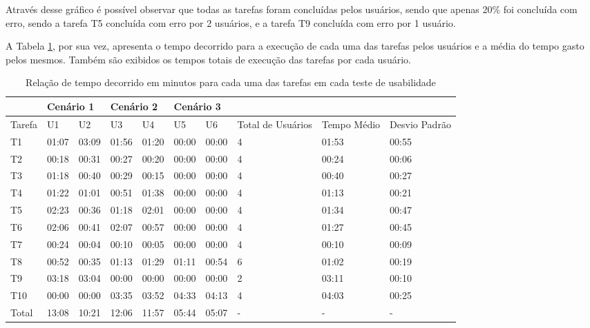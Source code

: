 Através desse gráfico é possível observar que todas as tarefas foram concluídas pelos 
usuários, sendo que apenas 20\% foi concluída com erro, sendo a tarefa T5 concluída com 
erro por 2 usuários, e a tarefa T9 concluída com erro por 1 usuário.

A Tabela \ref{table:tempos-execucao}, por sua vez, apresenta o tempo decorrido para a execução 
de cada uma das tarefas pelos usuários e a média do tempo gasto pelos mesmos. Também são 
exibidos os tempos totais de execução das tarefas por cada usuário.

\begin{table}[!htb]
    \centering
    \caption{ Relação de tempo decorrido em minutos para cada uma das tarefas em cada teste de usabilidade}
    \label{table:tempos-execucao}
    \begin{tabular}{|p{1.2cm}|p{1.2cm}|p{1.2cm}|p{1.2cm}|p{1.2cm}|p{1.2cm}|p{1.2cm}|p{1.2cm}|p{1.5cm}|p{1.2cm}|}
        \hline
        &  \multicolumn{2}{p{2.4cm}|}{Cenário 1} & \multicolumn{2}{p{2.4cm}|}{Cenário 2} & \multicolumn{2}{p{2.4cm}|}{Cenário 3} & & &\\
        \hline
        Tarefa & U1 & U2 & U3 & U4 & U5 & U6 & Total de Usuários & Tempo Médio & Desvio Padrão \\
        \hline
        T1 & 01:07 & 03:09 & 01:56 & 01:20 & 00:00 & 00:00 & 4 & 01:53 & 00:55 \\
        \hline
        T2 & 00:18 & 00:31 & 00:27 & 00:20 & 00:00 & 00:00 & 4 & 00:24 & 00:06\\          
        \hline
        T3 & 01:18 & 00:40 & 00:29 & 00:15 & 00:00 & 00:00 & 4 & 00:40 & 00:27 \\
        \hline
        T4 & 01:22 & 01:01 & 00:51 & 01:38 & 00:00 & 00:00 & 4 & 01:13 & 00:21\\
        \hline
        T5 & 02:23 & 00:36 & 01:18 & 02:01 & 00:00 & 00:00 & 4 & 01:34 & 00:47\\
        \hline
        T6 & 02:06 & 00:41 & 02:07 & 00:57 & 00:00 & 00:00 & 4 & 01:27 & 00:45\\
        \hline
        T7 & 00:24 & 00:04 & 00:10 & 00:05 & 00:00 & 00:00 & 4 & 00:10 & 00:09\\
        \hline
        T8 & 00:52 & 00:35 & 01:13 & 01:29 & 01:11 & 00:54 & 6 & 01:02 & 00:19\\
        \hline
        T9 & 03:18 & 03:04 & 00:00 & 00:00 & 00:00 & 00:00 & 2 & 03:11 & 00:10\\
        \hline
        T10 & 00:00 & 00:00 & 03:35 & 03:52 & 04:33 & 04:13 & 4 & 04:03 & 00:25\\
        \hline 
        Total & 13:08 & 10:21 & 12:06 & 11:57 & 05:44 & 05:07 & - & - & -\\
        \hline   
    \end{tabular}
\end{table}


